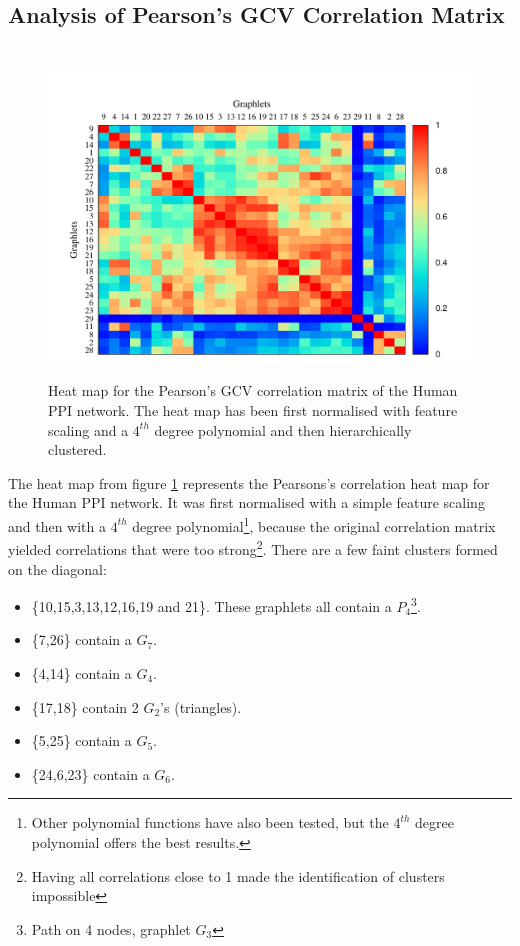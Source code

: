\subsection{Analysis of Pearson's GCV Correlation Matrix}

\begin{figure}
  \centering
  \hbox{\hspace{-1cm}
  \includegraphics[scale=1.0]
  {../code/final_results/human_ppi/heatmap_pearsons_hclust_human_ppi-poly-42.pdf}}
  \caption[Heat map for the Pearson's GCV correlation matrix of the Human PPI network]{Heat map for the Pearson's GCV correlation matrix of the Human PPI network. The heat map has been first normalised with feature scaling and a $4^{th}$ degree polynomial and then hierarchically clustered.}
  \label{fig:human_ppi}
\end{figure}



The heat map from figure \ref{fig:human_ppi} represents the Pearsons's correlation heat map for the Human PPI 
network. It was first normalised with a simple feature scaling and then with a $4^{th}$ degree polynomial\footnote{Other polynomial functions have also been tested, but the $4^{th}$ degree polynomial offers the best results.}, because the original correlation matrix yielded correlations that were too strong\footnote{Having all correlations close to 1 made the identification of clusters impossible}. There are a few faint clusters formed on the diagonal:
\begin{itemize}
 \item \{10,15,3,13,12,16,19 and 21\}. These graphlets all contain a $P_4$\footnote{Path on 4 nodes, graphlet $G_3$}.  
 \item \{7,26\} contain a $G_7$.
 \item \{4,14\} contain a $G_4$.
 \item \{17,18\} contain 2 $G_2$'s (triangles).
 \item \{5,25\} contain a $G_5$.
 \item \{24,6,23\} contain a $G_6$.
\end{itemize}

